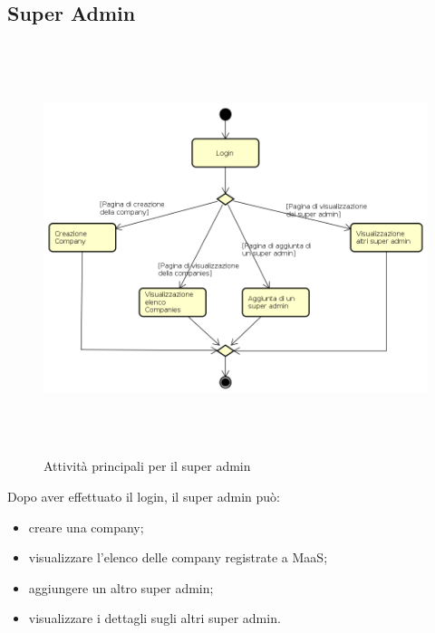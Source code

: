 \subsection{Super Admin}
\begin{figure}[H]
\begin{center}
\includegraphics[height=12cm]{res/sections/backend/activities/principaliSuperAdmin.png}
\caption{Attività principali per il super admin}
\end{center}
\end{figure}
Dopo aver effettuato il login, il super admin può:
\begin{itemize}
\item creare una company;
\item visualizzare l'elenco delle company registrate a MaaS;
\item aggiungere un altro super admin;
\item visualizzare i dettagli sugli altri super admin.
\end{itemize}
